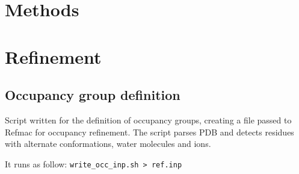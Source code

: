\section{Methods}
\section{Refinement}

\subsection{Occupancy group definition}\label{sup:occupancy}
Script written for the definition of occupancy groups, creating a file passed to Refmac for occupancy refinement. The script parses PDB and detects residues with alternate conformations, water molecules and ions. 

It runs as follow: \texttt{write_occ_inp.sh > ref.inp}

